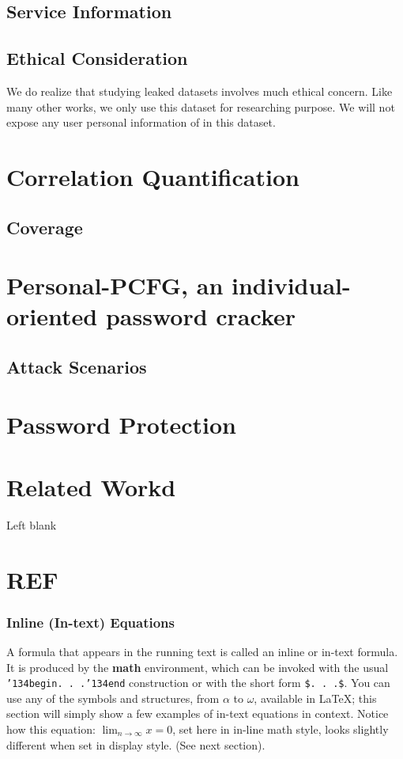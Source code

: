 \documentclass{sig-alternate}
\begin{document}
\subsection{Service Information}
\subsection{Ethical Consideration}
We do realize that studying leaked datasets involves much ethical concern. Like many other works, we only use this dataset for researching purpose. We will not expose any user personal information of in this dataset.
\section{Correlation Quantification}
\subsection{Coverage}

\section{Personal-PCFG, an individual-oriented password cracker}
\subsection{Attack Scenarios}
\section{Password Protection}

\section{Related Workd}
Left blank
\section{REF}

\subsubsection{Inline (In-text) Equations}
A formula that appears in the running text is called an
inline or in-text formula.  It is produced by the
\textbf{math} environment, which can be
invoked with the usual \texttt{{\char'134}begin. . .{\char'134}end}
construction or with the short form \texttt{\$. . .\$}. You
can use any of the symbols and structures,
from $\alpha$ to $\omega$, available in
\LaTeX\cite{Lamport:LaTeX}; this section will simply show a
few examples of in-text equations in context. Notice how
this equation: \begin{math}\lim_{n\rightarrow \infty}x=0\end{math},
set here in in-line math style, looks slightly different when
set in display style.  (See next section).
\end{document}
